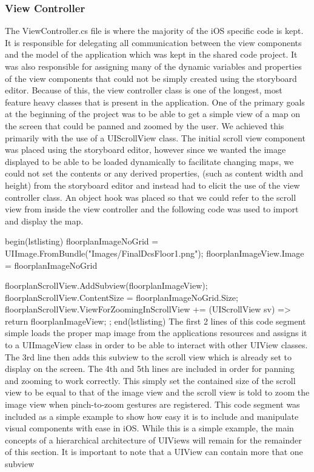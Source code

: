 \documentclass[main.tex]{subfiles}
\begin{document}
\subsubsection{View Controller}
The ViewController.cs file is where the majority of the iOS specific code is kept. It is responsible for delegating all communication between the view components and the model of the application which was kept in the shared code project. It was also responsible for assigning many of the dynamic variables and properties of the view components that could not be simply created using the storyboard editor. Because of this, the view controller class is one of the longest, most feature heavy classes that is present in the application. One of the primary goals at the beginning of the project was to be able to get a simple view of a map on the screen that could be panned and zoomed by the user. We achieved this primarily with the use of a UIScrollView class. The initial scroll view component was placed using the storyboard editor, however since we wanted the image displayed to be able to be loaded dynamically to facilitate changing maps, we could not set the contents or any derived properties, (such as content width and height) from the storyboard editor and instead had to elicit the use of the view controller class. An object hook was placed so that we could refer to the scroll view from inside the view controller and the following code was used to import and display the map.

begin(lstlisting)
floorplanImageNoGrid = UIImage.FromBundle("Images/FinalDcsFloor1.png");
floorplanImageView.Image = floorplanImageNoGrid

floorplanScrollView.AddSubview(floorplanImageView);
floorplanScrollView.ContentSize = floorplanImageNoGrid.Size;
floorplanScrollView.ViewForZoomingInScrollView += (UIScrollView sv) => { return floorplanImageView; };
end(lstlisting)
The first 2 lines of this code segment simple loads the proper map image from the applications resources and assigns it to a UIImageView class in order to be able to interact with other UIView classes. The 3rd line then adds this subview to the scroll view which is already set to display on the screen. The 4th and 5th lines are included in order for panning and zooming to work correctly. This simply set the contained size of the scroll view to be equal to that of the image view and the scroll view is told to zoom the image view when pinch-to-zoom gestures are registered. This code segment was included as a simple example to show how easy it is to include and manipulate visual components with ease in iOS. While this is a simple example, the main concepts of a hierarchical architecture of UIViews will remain for the remainder of this section. It is important to note that a UIView can contain more that one subview
\end{document}
